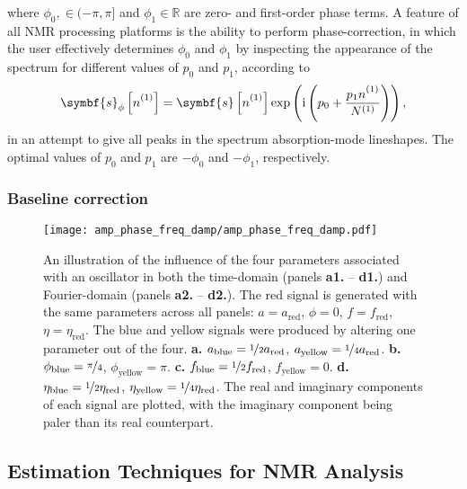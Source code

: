 where $\phi_0, \in (-\pi, \pi]$ and $\phi_1 \in \mathbb{R}$ are zero- and
first-order phase terms. A feature of all \ac{NMR} processing platforms is the
ability to perform phase-correction, in which the user effectively determines
$\phi_0$ and $\phi_1$ by inspecting the appearance of the spectrum for
different values of $p_0$ and  $p_1$, according to
\begin{equation}
    \symbf{s}_{\phi} \left[\none\right] =
    \symbf{s} \left[\none\right]
    \exp\left(\iu \left(p_0 + \frac{p_1 \none}{\None}\right)\right),
\end{equation}
in an attempt to give all peaks in the spectrum absorption-mode lineshapes. The
optimal values of $p_0$ and  $p_1$ are $-\phi_0$ and  $-\phi_1$, respectively.

\subsubsection{Baseline correction}
\cite{Cobas2006}

\begin{figure}
    \centering
    \texttt{[image: amp\_phase\_freq\_damp/amp\_phase\_freq\_damp.pdf]}
    \caption[
        An illustration of the influence of the four parameters associated
        with an oscillator in both the time-domain nels and Fourier-domain.
    ]{
        An illustration of the influence of the four parameters associated
        with an oscillator in both the time-domain (panels \textbf{a1.} --
        \textbf{d1.}) and Fourier-domain (panels \textbf{a2.} -- \textbf{d2.}).
        The red signal is generated with the same parameters across all panels:
        $a = a_{\text{red}}$, $\phi = 0$, $f = f_{\text{red}}$,  $\eta =
        \eta_{\text{red}}$.  The blue and yellow signals were produced by
        altering one parameter out of the four.
        \textbf{a.}
        $a_{\text{blue}} = \nicefrac{1}{2} a_{\text{red}}$,
        $a_{\text{yellow}} = \nicefrac{1}{4} a_{\text{red}}$.
        \textbf{b.}
        $\phi_{\text{blue}} = \nicefrac{\pi}{4}$,
        $\phi_{\text{yellow}} = \pi$.
        \textbf{c.}
        $f_{\text{blue}} = \nicefrac{1}{2} f_{\text{red}}$,
        $f_{\text{yellow}} = 0$.
        \textbf{d.}
        $\eta_{\text{blue}} = \nicefrac{1}{2}\eta_{\text{red}}$,
        $\eta_{\text{yellow}} = \nicefrac{1}{4}\eta_{\text{red}}$.
        The real and imaginary components of each signal are plotted, with the
        imaginary component being paler than its real counterpart.
    }
    \label{fig:amp-phase-freq-damp}
\end{figure}
\subsection{Estimation Techniques for NMR Analysis}
